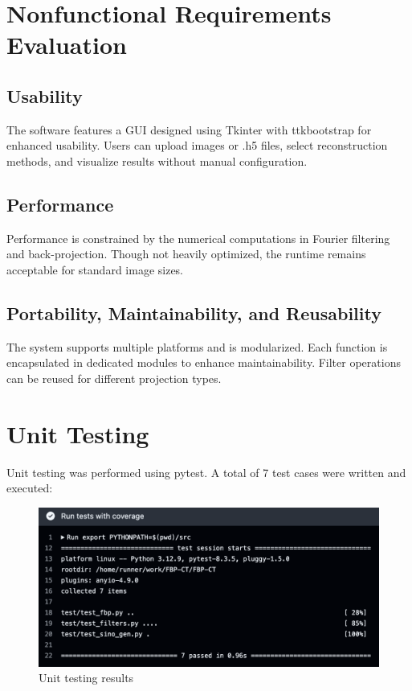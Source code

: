 \documentclass[12pt, titlepage]{article}
\begin{document}
\section{Nonfunctional Requirements Evaluation}

\subsection{Usability}
The software features a GUI designed using Tkinter with ttkbootstrap for
enhanced usability. Users can upload images or .h5 files, select reconstruction
methods, and visualize results without manual configuration.

\subsection{Performance}
Performance is constrained by the numerical computations in Fourier filtering
and back-projection. Though not heavily optimized, the runtime remains
acceptable for standard image sizes.

\subsection{Portability, Maintainability, and Reusability}
The system supports multiple platforms and is modularized. Each function is
encapsulated in dedicated modules to enhance maintainability. Filter operations
can be reused for different projection types.

\section{Unit Testing}
Unit testing was performed using pytest. A total of 7 test cases were written and executed:
\begin{figure}[H]
  \includegraphics[scale=0.8]{test.png}
\caption{Unit testing results}
\label{test}
\end{figure}
\end{document}
